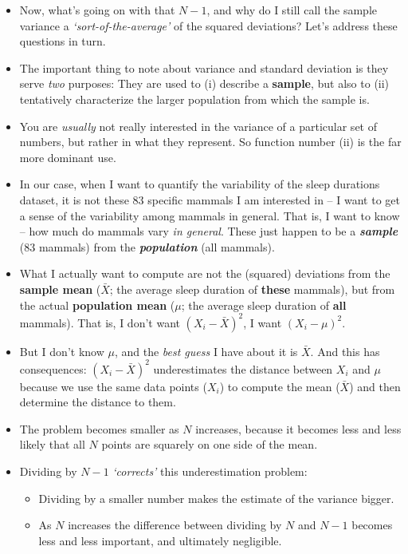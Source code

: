 \documentclass[
]{book}
\providecommand{\tightlist}{%
  \setlength{\itemsep}{0pt}\setlength{\parskip}{0pt}}
\begin{document}
\begin{itemize}
\item
  Now, what's going on with that \(N-1\), and why do I still call the sample variance a \emph{`sort-of-the-average'} of the squared deviations? Let's address these questions in turn.
\item
  The important thing to note about variance and standard deviation is they serve \emph{two} purposes: They are used to (i) describe a \textbf{sample}, but also to (ii) tentatively characterize the larger population from which the sample is.
\item
  You are \emph{usually} not really interested in the variance of a particular set of numbers, but rather in what they represent. So function number (ii) is the far more dominant use.
\item
  In our case, when I want to quantify the variability of the sleep durations dataset, it is not these 83 specific mammals I am interested in -- I want to get a sense of the variability among mammals in general. That is, I want to know -- how much do mammals vary \emph{in general}. These just happen to be a \textbf{\emph{sample}} (83 mammals) from the \textbf{\emph{population}} (all mammals).
\item
  What I actually want to compute are not the (squared) deviations from the \textbf{sample mean} (\(\bar{X}\); the average sleep duration of \textbf{these} mammals), but from the actual \textbf{population mean} (\(\mu\); the average sleep duration of \textbf{all} mammals). That is, I don't want \(( X_i - \bar{X})^2\), I want \(( X_i - \mu)^2\).
\item
  But I don't know \(\mu\), and the \emph{best guess} I have about it is \(\bar{X}\). And this has consequences: \(( X_i - \bar{X})^2\) underestimates the distance between \(X_i\) and \(\mu\) because we use the same data points (\(X_i\)) to compute the mean (\(\bar{X}\)) and then determine the distance to them.
\end{itemize}

\begin{itemize}
\item
  The problem becomes smaller as \(N\) increases, because it becomes less and less likely that all \(N\) points are squarely on one side of the mean.
\item
  Dividing by \(N-1\) \emph{`corrects'} this underestimation problem:

  \begin{itemize}
  \tightlist
  \item
    Dividing by a smaller number makes the estimate of the variance bigger.
  \item
    As \(N\) increases the difference between dividing by \(N\) and \(N-1\) becomes less and less important, and ultimately negligible.
  \end{itemize}
\end{itemize}
\end{document}
